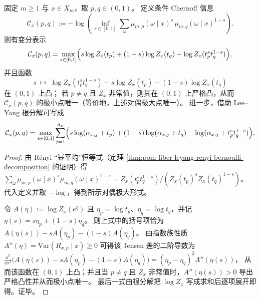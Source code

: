 \begin{corollary}\label{cor:pom-fiber-leyang-chernoff-unique-minimizer}
固定 \(m\ge 1\) 与 \(x\in X_m\)，取 \(p,q\in(0,1)\)。
定义条件 Chernoff 信息
\[
\mathcal{C}_x(p,q)
:=
-\log\!\left(\inf_{s\in[0,1]}\sum_{\omega}\mu_{m,p}(\omega\mid x)^s\,\mu_{m,q}(\omega\mid x)^{1-s}\right).
\]
则有变分表示
\[
\mathcal{C}_x(p,q)
=\max_{s\in[0,1]}
\Bigl(
s\log Z_x(t_p)+(1-s)\log Z_x(t_q)-\log Z_x(t_p^s t_q^{1-s})
\Bigr),
\]
并且函数
\[
s\ \longmapsto\ \log Z_x(t_p^s t_q^{1-s})-s\log Z_x(t_p)-(1-s)\log Z_x(t_q)
\]
在 \((0,1)\) 上凸；
若 \(p\neq q\) 且 \(Z_x\) 非常值，则其在 \((0,1)\) 上严格凸，从而 \(\mathcal{C}_x(p,q)\) 的极小点唯一（等价地，上述对偶极大点唯一）。
进一步，借助 Lee--Yang 根分解可写成
\[
\mathcal{C}_x(p,q)
=\max_{s\in[0,1]}\sum_{j=1}^{d_x}
\Bigl(
s\log(\alpha_{x,j}+t_p)+(1-s)\log(\alpha_{x,j}+t_q)-\log(\alpha_{x,j}+t_p^s t_q^{1-s})
\Bigr).
\]
\end{corollary}
\begin{proof}
由 R\'enyi “幂平均”恒等式（定理 \ref{thm:pom-fiber-leyang-renyi-bernoulli-decomposition} 的证明）得
\(
\sum_{\omega}\mu_{m,p}(\omega\mid x)^s\mu_{m,q}(\omega\mid x)^{1-s}
=Z_x(t_p^s t_q^{1-s})/(Z_x(t_p)^s Z_x(t_q)^{1-s})
\)。
代入定义并取 \(-\log\)，得到所示对偶极大形式。
\par
令 \(A(\eta):=\log Z_x(e^\eta)\) 且 \(\eta_p=\log t_p\)、\(\eta_q=\log t_q\)，并记 \(\eta(s)=s\eta_p+(1-s)\eta_q\)。
则上式中的括号项恰为
\(
A(\eta(s))-sA(\eta_p)-(1-s)A(\eta_q)
\)。
由指数族性质 \(A''(\eta)=\mathrm{Var}(R_{x,p}\mid x)\ge 0\) 可得该 Jensen 差的二阶导数为
\(
\frac{\dd^2}{\dd s^2}\bigl(A(\eta(s))-sA(\eta_p)-(1-s)A(\eta_q)\bigr)
=(\eta_p-\eta_q)^2A''(\eta(s))
\)，
从而该函数在 \((0,1)\) 上凸；并且当 \(p\neq q\) 且 \(Z_x\) 非常值时，\(A''(\eta(s))>0\) 导出严格凸性并从而极小点唯一。
最后一式由根分解把 \(\log Z_x\) 写成求和后逐项展开即得。证毕。
\end{proof}

